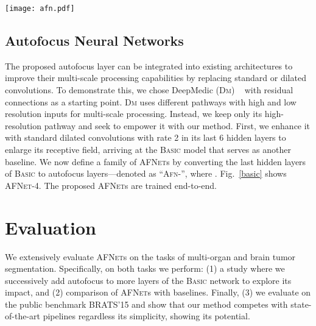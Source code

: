 \documentclass{llncs}
\newcommand{\afn}{\textsc{AFNet}}
\begin{document}
\begin{figure*}[t]
\center
\texttt{[image: afn.pdf]}
\vspace{-2mm}
\caption{The \afn-4 model. Layers 1-2 are standard convolutions and 3-4 are dilated with rate 2. Layers 4-8 are autofocus layers, denoted with red. All layers except the classification layer use  kernels. Yellow rectangles represent ReLU layers. Residual connections are used. Number and size of feature maps shown as (number  size). 
}\label{basic}
\vspace{-5mm}
\end{figure*}
\vspace{-4mm}
\subsection{Autofocus Neural Networks}
\label{afn}
\vspace{-1mm}

The proposed autofocus layer can be integrated into existing architectures to improve their multi-scale processing capabilities by replacing standard or dilated convolutions. To demonstrate this, we chose DeepMedic (\textsc{Dm}) ~\cite{Kamnitsas2017EfficientM3} with residual connections \cite{kamnitsas2016deepmedic} as a starting point. \textsc{Dm} uses different pathways with high and low resolution inputs for multi-scale processing. Instead, we keep only its high-resolution pathway and seek to empower it with our method. First, we enhance it with standard dilated convolutions with rate 2 in its last 6 hidden layers to enlarge its receptive field, arriving at the \textsc{Basic} model that serves as another baseline. We now define a family of \afn{}s by converting the last  hidden layers of \textsc{Basic} to autofocus layers---denoted as ``\textsc{Afn}-'', where . Fig.~\ref{basic} shows \afn-4. The proposed \afn s are trained end-to-end.

\vspace{-3mm}
\section{Evaluation}
\vspace{-3mm}
\label{sec:evaluation}
We extensively evaluate \afn{}s on the tasks of multi-organ and brain tumor segmentation. Specifically, on both tasks we perform: (1) a study where we successively add autofocus to more layers of the \textsc{Basic} network to explore its impact, and (2) comparison of \afn s with baselines. Finally, (3) we evaluate on the public benchmark BRATS'15 and show that our method competes with state-of-the-art pipelines regardless its simplicity, showing its potential.
\vspace{-5mm}
\end{document}

